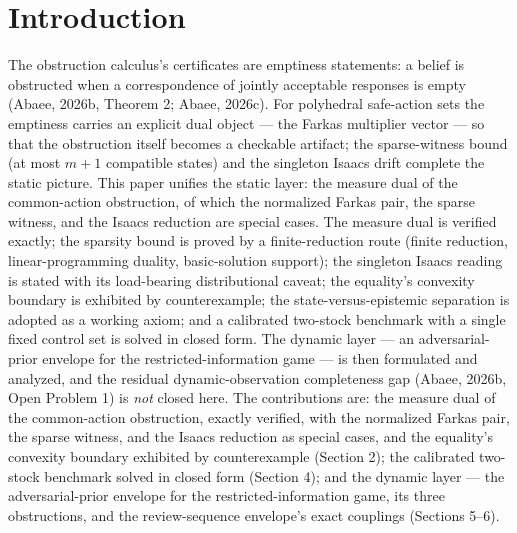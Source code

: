 \documentclass[10pt,twocolumn]{article}
\theoremstyle{definition}
\begin{document}
\section{Introduction}

The obstruction calculus's certificates are emptiness statements: a belief is
obstructed when a correspondence of jointly acceptable responses is empty
(Abaee, 2026b, Theorem 2; Abaee, 2026c). For polyhedral safe-action sets the
emptiness carries an explicit dual object --- the Farkas multiplier vector
--- so that the obstruction itself becomes a checkable artifact; the
sparse-witness bound (at most $m+1$ compatible states) and the singleton
Isaacs drift complete the static picture. This paper unifies the static layer: the measure dual of the common-action obstruction, of which the normalized Farkas pair, the sparse witness, and the Isaacs reduction are special cases. The measure dual is verified exactly; the sparsity bound is proved by a finite-reduction route (finite reduction, linear-programming duality, basic-solution support); the singleton Isaacs reading is stated with its load-bearing distributional caveat; the equality's convexity boundary is exhibited by counterexample; the state-versus-epistemic separation is adopted as a working axiom; and a calibrated two-stock benchmark with a single fixed control set is solved in closed form. The dynamic layer --- an adversarial-prior envelope for the restricted-information game --- is then formulated and analyzed, and the residual dynamic-observation completeness gap (Abaee, 2026b, Open Problem 1) is \emph{not} closed here. The contributions are: the measure dual of the common-action obstruction, exactly verified, with the normalized Farkas pair, the sparse witness, and the Isaacs reduction as special cases, and the equality's convexity boundary exhibited by counterexample (Section 2); the calibrated two-stock benchmark solved in closed form (Section 4); and the dynamic layer --- the adversarial-prior envelope for the restricted-information game, its three obstructions, and the review-sequence envelope's exact couplings (Sections 5--6).
\end{document}

